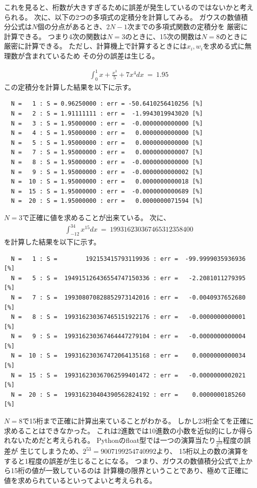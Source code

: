 \documentclass[dvipdfmx]{jsarticle}
\begin{document}
これを見ると、桁数が大きすぎるために誤差が発生しているのではないかと考えられる。
次に、以下の2つの多項式の定積分を計算してみる。
ガウスの数値積分公式は$N$個の分点があるとき、$2N-1$次までの多項式関数の定積分を
厳密に計算できる。
つまり4次の関数は$N=3$のときに、15次の関数は$N=8$のときに厳密に計算できる。
ただし、計算機上で計算するときには$x_i,w_i$を求める式に無理数が含まれているため
その分の誤差は生じる。

\begin{eqnarray}
  \int_{0}^{1} x+\frac{x^3}{5}+7x^4 dx ~=~ 1.95
\end{eqnarray}
この定積分を計算した結果を以下に示す。
\begin{verbatim}
  N =   1 : S = 0.96250000 : err = -50.6410256410256 [%]
  N =   2 : S = 1.91111111 : err =  -1.9943019943020 [%]
  N =   3 : S = 1.95000000 : err =  -0.0000000000000 [%]
  N =   4 : S = 1.95000000 : err =   0.0000000000000 [%]
  N =   5 : S = 1.95000000 : err =   0.0000000000000 [%]
  N =   7 : S = 1.95000000 : err =   0.0000000000007 [%]
  N =   8 : S = 1.95000000 : err =  -0.0000000000000 [%]
  N =   9 : S = 1.95000000 : err =  -0.0000000000002 [%]
  N =  10 : S = 1.95000000 : err =   0.0000000000018 [%]
  N =  15 : S = 1.95000000 : err =  -0.0000000000689 [%]
  N =  20 : S = 1.95000000 : err =   0.0000000071594 [%]
\end{verbatim}
$N=3$で正確に値を求めることが出来ている。
次に、
\begin{eqnarray}
  \int_{-12}^{34} x^{15} dx ~=~ 199316230367465312358400
  \label{fomula:x15}
\end{eqnarray}
を計算した結果を以下に示す。
\begin{verbatim}
  N =   1 : S =        192153415793119936 : err =  -99.9999035936936 [%]
  N =   5 : S =  194915126436554747150336 : err =   -2.2081011279395 [%]
  N =   7 : S =  199308070828852973142016 : err =   -0.0040937652680 [%]
  N =   8 : S =  199316230367465151922176 : err =   -0.0000000000001 [%]
  N =   9 : S =  199316230367464447279104 : err =   -0.0000000000004 [%]
  N =  10 : S =  199316230367472064135168 : err =    0.0000000000034 [%]
  N =  15 : S =  199316230367062599401472 : err =   -0.0000000002021 [%]
  N =  20 : S =  199316230404390562824192 : err =    0.0000000185260 [%]
\end{verbatim}

$N=8$で15桁まで正確に計算出来ていることがわかる。
しかし23桁全てを正確に求めることはできなかった。
これは2進数では10進数の小数を近似的にしか得られないためだと考えられる。
Pythonのfloat型では一つの演算当たり$\displaystyle \frac{1}{2^{53}}$程度の誤差が
生じてしまうため、$2^{53}=9007199254740992$より、
15桁以上の数の演算をすると1程度の誤差が生じることになる。
つまり、ガウスの数値積分公式で上から15桁の値が一致しているのは
計算機の限界ということであり、極めて正確に値を求められているといってよいと考えられる。
\end{document}
